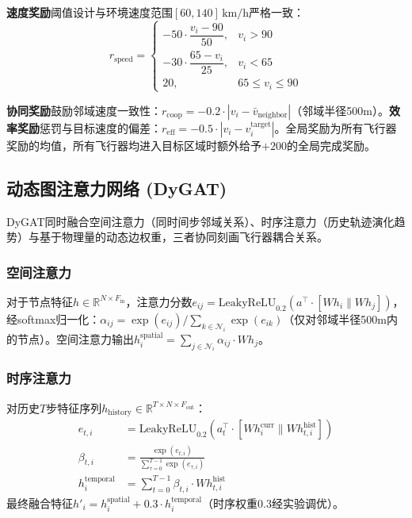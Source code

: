 \documentclass[12pt,a4paper,UTF8]{ctexart}
\begin{document}
\textbf{速度奖励}阈值设计与环境速度范围$[60, 140]\,\text{km/h}$严格一致：
\begin{equation}
    r_{\text{speed}} =
    \begin{cases}
        -50 \cdot \dfrac{v_i - 90}{50}, & v_i > 90 \\[8pt]
        -30 \cdot \dfrac{65 - v_i}{25}, & v_i < 65 \\[8pt]
        20, & 65 \leq v_i \leq 90
    \end{cases}
\end{equation}

\textbf{协同奖励}鼓励邻域速度一致性：$r_{\text{coop}} = -0.2 \cdot |v_i - \bar{v}_{\text{neighbor}}|$（邻域半径500m）。\textbf{效率奖励}惩罚与目标速度的偏差：$r_{\text{eff}} = -0.5 \cdot |v_i - v_i^{\text{target}}|$。全局奖励为所有飞行器奖励的均值，所有飞行器均进入目标区域时额外给予$+200$的全局完成奖励。

\subsection{动态图注意力网络 (DyGAT)}

DyGAT同时融合空间注意力（同时间步邻域关系）、时序注意力（历史轨迹演化趋势）与基于物理量的动态边权重，三者协同刻画飞行器耦合关系。

\subsubsection{空间注意力}

对于节点特征$h \in \mathbb{R}^{N \times F_{\text{in}}}$，注意力分数$e_{ij} = \text{LeakyReLU}_{0.2}(a^{\top} \cdot [Wh_i \parallel Wh_j])$，经softmax归一化：$\alpha_{ij} = \exp(e_{ij}) / \sum_{k \in \mathcal{N}_i} \exp(e_{ik})$（仅对邻域半径500m内的节点）。空间注意力输出$h_i^{\text{spatial}} = \sum_{j \in \mathcal{N}_i} \alpha_{ij} \cdot Wh_j$。

\subsubsection{时序注意力}

对历史$T$步特征序列$h_{\text{history}} \in \mathbb{R}^{T \times N \times F_{\text{out}}}$：
\begin{align}
    e_{t,i} &= \text{LeakyReLU}_{0.2}\left(a_t^{\top} \cdot [Wh_i^{\text{curr}} \parallel Wh_{t,i}^{\text{hist}}]\right) \\
    \beta_{t,i} &= \frac{\exp(e_{t,i})}{\sum_{\tau=0}^{T-1} \exp(e_{\tau,i})} \\
    h_i^{\text{temporal}} &= \sum_{t=0}^{T-1} \beta_{t,i} \cdot Wh_{t,i}^{\text{hist}}
\end{align}
最终融合特征$h'_i = h_i^{\text{spatial}} + 0.3 \cdot h_i^{\text{temporal}}$（时序权重0.3经实验调优）。
\end{document}
